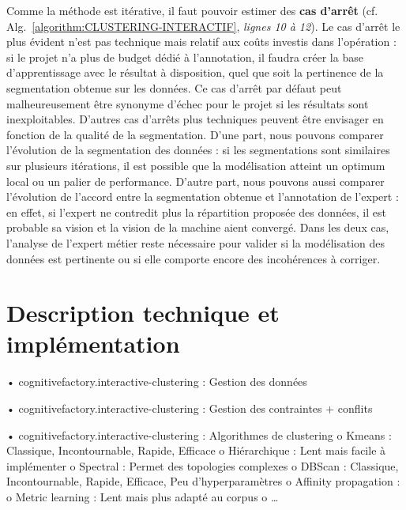 		Comme la méthode est itérative, il faut pouvoir estimer des \textbf{cas d'arrêt} (cf. Alg.~\ref{algorithm:CLUSTERING-INTERACTIF}, \textit{lignes 10 à 12}).
		Le cas d'arrêt le plus évident n'est pas technique mais relatif aux coûts investis dans l'opération : si le projet n'a plus de budget dédié à l'annotation, il faudra créer la base d'apprentissage avec le résultat à disposition, quel que soit la pertinence de la segmentation obtenue sur les données. Ce cas d'arrêt par défaut peut malheureusement être synonyme d'échec pour le projet si les résultats sont inexploitables.
		D'autres cas d'arrêts plus techniques peuvent être envisager en fonction de la qualité de la segmentation.
		D'une part, nous pouvons comparer l'évolution de la segmentation des données : si les segmentations sont similaires sur plusieurs itérations, il est possible que la modélisation atteint un optimum local ou un palier de performance. D'autre part, nous pouvons aussi comparer l'évolution de l'accord entre la segmentation obtenue et l'annotation de l'expert : en effet, si l'expert ne contredit plus la répartition proposée des données, il est probable sa vision et la vision de la machine aient convergé.
		Dans les deux cas, l'analyse de l'expert métier reste nécessaire pour valider si la modélisation des données est pertinente ou si elle comporte encore des incohérences à corriger.

		
    \section{Description technique et implémentation}

        •	cognitivefactory.interactive-clustering : Gestion des données
    
        •	cognitivefactory.interactive-clustering : Gestion des contraintes + conflits

        •	cognitivefactory.interactive-clustering : Algorithmes de clustering
            o	Kmeans : Classique, Incontournable, Rapide, Efficace
            o	Hiérarchique : Lent mais facile à implémenter
            o	Spectral : Permet des topologies complexes
            o	DBScan : Classique, Incontournable, Rapide, Efficace, Peu d’hyperparamètres
            o	Affinity propagation : 
            o	Metric learning : Lent mais plus adapté au corpus
            o	…


